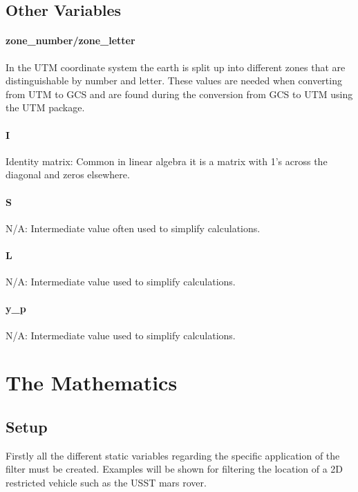 \documentclass{article}
\begin{document}
\subsection{Other Variables}
\paragraph{zone\_number/zone\_letter}
In the UTM coordinate system the earth is split up into different zones that are distinguishable by number and letter. These values are needed when converting from UTM to GCS and are found during the conversion from GCS to UTM using the UTM package. 
\paragraph{I}
Identity matrix: Common in linear algebra it is a matrix with 1's across the diagonal and zeros elsewhere.
\paragraph{S}
N/A: Intermediate value often used to simplify calculations.
\paragraph{L}
N/A: Intermediate value used to simplify calculations.
\paragraph{y\_p}
N/A: Intermediate value used to simplify calculations.







 


\section{The Mathematics}
\subsection{Setup}
Firstly all the different static variables regarding the specific application of the filter must be created. Examples will be shown for filtering the location of a 2D restricted vehicle such as the USST mars rover.\par
\end{document}
